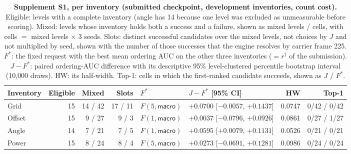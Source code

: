 \begin{table}[t]
\centering
\scriptsize
\setlength{\tabcolsep}{2pt}
\begin{revblock}
\caption{\textbf{Supplement S1, per inventory (submitted checkpoint, development inventories, count cost).} Eligible: levels with a complete inventory (angle has 14 because one level was excluded as unmeasurable before scoring). Mixed: levels whose inventory holds both a success and a failure, shown as mixed levels / cells, with cells $=$ mixed levels $\times$ 3 seeds. Slots: distinct successful candidates over the mixed levels, not choices by $J$ and not multiplied by seed, shown with the number of those successes that the engine resolves by carrier frame 225. $F^{*}$: the fixed request with the best mean ordering AUC on the other three inventories ($=r^\dagger$ of the submission). $J-F^{*}$: paired ordering-AUC difference with its descriptive 95\% level-clustered percentile bootstrap interval (10{,}000 draws). HW: its half-width. Top-1: cells in which the first-ranked candidate succeeds, shown as $J$ / $F^{*}$.}
\label{tab:app:dev:s1}
\begin{tabular}{@{}lrrrllrr@{}}
\toprule
Inventory & Eligible & Mixed & Slots & $F^{*}$ & $J-F^{*}$ [95\% CI] & HW & Top-1 \\
\midrule
Grid   & 15 & 14 / 42 & 17 / 11 & $F(5,\textsf{macro})$ & $+0.0700$ [$-0.0057$, $+0.1437$] & 0.0747 & 0/42 / 0/42 \\
Offset & 15 & 9 / 27  & 9 / 3   & $F(1,\textsf{macro})$ & $+0.0037$ [$-0.0796$, $+0.0926$] & 0.0861 & 0/27 / 1/27 \\
Angle  & 14 & 7 / 21  & 7 / 5   & $F(1,\textsf{macro})$ & $+0.0595$ [$+0.0079$, $+0.1131$] & 0.0526 & 0/21 / 0/21 \\
Power  & 15 & 8 / 24  & 8 / 4   & $F(5,\textsf{macro})$ & $+0.0273$ [$-0.0691$, $+0.1281$] & 0.0986 & 0/24 / 0/24 \\
\bottomrule
\end{tabular}
\end{revblock}
\end{table}

